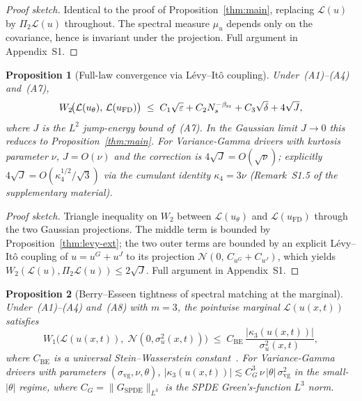\documentclass[review,12pt]{elsarticle}
\newtheorem{proposition}{Proposition}
\begin{document}
\begin{proof}[Proof sketch]
Identical to the proof of Proposition~\ref{thm:main}, replacing
$\mathcal L(u)$ by $\Pi_2\mathcal L(u)$ throughout. The spectral
measure $\mu_u$ depends only on the covariance, hence is invariant
under the projection. Full argument in Appendix~S1.
\end{proof}

\begin{proposition}[Full-law convergence via L\'evy--It\^o
coupling]\label{prop:levy-ito}
Under~(A1)--(A4) and~(A7),
\begin{equation}\label{eq:levy-ito-bound}
W_2\!\bigl(\mathcal L(u_\theta),\,\mathcal L(u_{\mathrm{FD}})\bigr)
\;\le\; C_1\sqrt{\varepsilon} + C_2 N_s^{-\beta_{\rm sr}} + C_3\sqrt\delta
+ 4\sqrt{J},
\end{equation}
where $J$ is the $L^2$ jump-energy bound of~(A7). In the Gaussian
limit $J\to 0$ this reduces to Proposition~\ref{thm:main}. For
Variance-Gamma drivers with kurtosis parameter $\nu$, $J = O(\nu)$
and the correction is $4\sqrt{J} = O(\sqrt\nu)$; explicitly
$4\sqrt{J} = O(\kappa_4^{1/2}/\sqrt 3)$ via the cumulant identity
$\kappa_4 = 3\nu$ (Remark~S1.5 of the supplementary material).
\end{proposition}

\begin{proof}[Proof sketch]
Triangle inequality on $W_2$ between $\mathcal L(u_\theta)$ and
$\mathcal L(u_{\mathrm{FD}})$ through the two Gaussian projections.
The middle term is bounded by Proposition~\ref{thm:levy-ext}; the
two outer terms are bounded by an explicit L\'evy--It\^o coupling
of $u = u^G + u^J$ to its projection
$\mathcal N(0,\,C_{u^G}+C_{u^J})$, which yields
$W_2(\mathcal L(u),\Pi_2\mathcal L(u)) \le 2\sqrt{J}$. Full
argument in Appendix~S1.
\end{proof}

\begin{proposition}[Berry--Esseen tightness of spectral matching at
the marginal]\label{cor:berry-esseen}
Under~(A1)--(A4) and~(A8) with $m=3$, the pointwise marginal
$\mathcal L(u(x,t))$ satisfies
\[
W_1\!\bigl(\mathcal L(u(x,t)),\;\mathcal N(0,\sigma_u^2(x,t))\bigr)
\;\le\; C_{\mathrm{BE}}\,
\frac{|\kappa_3(u(x,t))|}{\sigma_u^2(x,t)},
\]
where $C_{\mathrm{BE}}$ is a universal Stein--Wasserstein
constant~\citep{ChenGoldsteinShao2011}. For Variance-Gamma drivers
with parameters $(\sigma_{\mathrm{vg}}, \nu, \theta)$,
$|\kappa_3(u(x,t))| \lesssim C_G^3\,\nu\,|\theta|\,
\sigma_{\mathrm{vg}}^2$ in the small-$|\theta|$ regime, where
$C_G = \|G_{\mathrm{SPDE}}\|_{L^3}$ is the SPDE Green's-function
$L^3$ norm.
\end{proposition}
\end{document}
